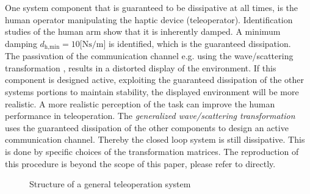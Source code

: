 \documentclass[a4paper,twoside, openright,12pt]{report}
\begin{document}
One system component that is guaranteed to be dissipative at all times, is the human operator manipulating the haptic device (teleoperator). Identification studies \cite{Rahman1999} of the human arm show that it is inherently damped. A minimum damping $d_{\text{h,min}}=10\text{[Ns/m]}$ is identified, which is the guaranteed dissipation.\\
The passivation of the communication channel e.g. using the wave/scattering transformation \cite{Niemeyer2004}, results in a distorted display of the environment. If this component is designed active, exploiting the guaranteed dissipation of the other systems portions to maintain stability, the displayed environment will be more realistic. A more realistic perception of the task can improve the human performance in teleoperation. The \emph{generalized wave/scattering transformation} \cite{Hirche2012} uses the guaranteed dissipation of the other components to design an active communication channel. Thereby the closed loop system is still dissipative. This is done by specific choices of the transformation matrices. The reproduction of this procedure is beyond the scope of this paper, please refer to \cite{Hirche2012} directly.
\begin{figure}
	\centering
	\footnotesize
	\def\svgwidth{1\columnwidth}
	
	\caption{Structure of a general teleoperation system}
	\label{FIG:TeleoperationScheme}
\end{figure}
\end{document}

